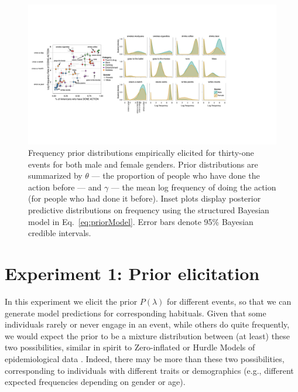 \documentclass[10pt,letterpaper]{article}
\begin{document}
\begin{figure}[t]
\centering
  \includegraphics[width=\textwidth]{prior-scatter-insets2}
  \caption{Frequency prior distributions empirically elicited for thirty-one events for both male and female genders. Prior distributions are summarized by $\theta$ --- the proportion of people who have done the action before --- and $\gamma$ --- the mean log frequency of doing the action (for people who had done it before).  Inset plots display posterior predictive distributions on frequency using the structured Bayesian model in Eq.~\ref{eq:priorModel}. Error bars denote 95\% Bayesian credible intervals.}
  \label{fig:priorScatter}
\end{figure}
%


\section{Experiment 1: Prior elicitation}

%
In this experiment we elicit the prior $P(\lambda)$ for different events, so that we can generate model predictions for corresponding habituals.
Given that some individuals rarely or never engage in an event, while others do quite frequently, we would expect the prior to be a mixture distribution between (at least) these two possibilities, similar in spirit to Zero-inflated or Hurdle Models of epidemiological data \cite{hurdleModels}.
Indeed, there may be more than these two possibilities, corresponding to individuals with different traits or demographics (e.g., different expected frequencies depending on gender or age). 
\end{document}
